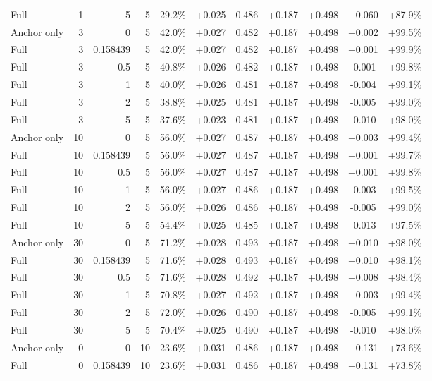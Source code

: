 \begin{table}[htbp]
\begin{tabular}{lrrrccccccc}
Full & 1 & 5 & 5 & 29.2\% & +0.025 & 0.486 & +0.187 & +0.498 & +0.060 & +87.9\% \\
Anchor only & 3 & 0 & 5 & 42.0\% & +0.027 & 0.482 & +0.187 & +0.498 & +0.002 & +99.5\% \\
Full & 3 & 0.158439 & 5 & 42.0\% & +0.027 & 0.482 & +0.187 & +0.498 & +0.001 & +99.9\% \\
Full & 3 & 0.5 & 5 & 40.8\% & +0.026 & 0.482 & +0.187 & +0.498 & -0.001 & +99.8\% \\
Full & 3 & 1 & 5 & 40.0\% & +0.026 & 0.481 & +0.187 & +0.498 & -0.004 & +99.1\% \\
Full & 3 & 2 & 5 & 38.8\% & +0.025 & 0.481 & +0.187 & +0.498 & -0.005 & +99.0\% \\
Full & 3 & 5 & 5 & 37.6\% & +0.023 & 0.481 & +0.187 & +0.498 & -0.010 & +98.0\% \\
Anchor only & 10 & 0 & 5 & 56.0\% & +0.027 & 0.487 & +0.187 & +0.498 & +0.003 & +99.4\% \\
Full & 10 & 0.158439 & 5 & 56.0\% & +0.027 & 0.487 & +0.187 & +0.498 & +0.001 & +99.7\% \\
Full & 10 & 0.5 & 5 & 56.0\% & +0.027 & 0.487 & +0.187 & +0.498 & +0.001 & +99.8\% \\
Full & 10 & 1 & 5 & 56.0\% & +0.027 & 0.486 & +0.187 & +0.498 & -0.003 & +99.5\% \\
Full & 10 & 2 & 5 & 56.0\% & +0.026 & 0.486 & +0.187 & +0.498 & -0.005 & +99.0\% \\
Full & 10 & 5 & 5 & 54.4\% & +0.025 & 0.485 & +0.187 & +0.498 & -0.013 & +97.5\% \\
Anchor only & 30 & 0 & 5 & 71.2\% & +0.028 & 0.493 & +0.187 & +0.498 & +0.010 & +98.0\% \\
Full & 30 & 0.158439 & 5 & 71.6\% & +0.028 & 0.493 & +0.187 & +0.498 & +0.010 & +98.1\% \\
Full & 30 & 0.5 & 5 & 71.6\% & +0.028 & 0.492 & +0.187 & +0.498 & +0.008 & +98.4\% \\
Full & 30 & 1 & 5 & 70.8\% & +0.027 & 0.492 & +0.187 & +0.498 & +0.003 & +99.4\% \\
Full & 30 & 2 & 5 & 72.0\% & +0.026 & 0.490 & +0.187 & +0.498 & -0.005 & +99.1\% \\
Full & 30 & 5 & 5 & 70.4\% & +0.025 & 0.490 & +0.187 & +0.498 & -0.010 & +98.0\% \\
Anchor only & 0 & 0 & 10 & 23.6\% & +0.031 & 0.486 & +0.187 & +0.498 & +0.131 & +73.6\% \\
Full & 0 & 0.158439 & 10 & 23.6\% & +0.031 & 0.486 & +0.187 & +0.498 & +0.131 & +73.8\% \\

\end{tabular}
\end{table}
